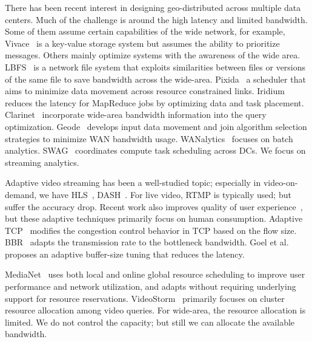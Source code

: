  There has been recent interest in designing
geo-distributed across multiple data centers. Much of the challenge is around
the high latency and limited bandwidth. Some of them assume certain capabilities
of the wide network, for example, Vivace~\cite{cho2012surviving} is a key-value
storage system but assumes the ability to prioritize messages. Others mainly
optimize systems with the awareness of the wide
area. LBFS~\cite{muthitacharoen2001low} is a network file system that exploits
similarities between files or versions of the same file to save bandwidth across
the wide-area.  Pixida~\cite{kloudas2015pixida} a scheduler that aims to
minimize data movement across resource constrained links.
Iridium~\cite{pu2015low} reduces the latency for MapReduce jobs by optimizing
data and task placement. Clarinet~\cite{viswanathan2016clarinet} incorporate
wide-area bandwidth information into the query
optimization. Geode~\cite{vulimiri2015global} develops input data movement and
join algorithm selection strategies to minimize WAN bandwidth
usage. WANalytics~\cite{vulimiri2015wananlytics} focuses on batch
analytics. SWAG~\cite{hung2015scheduling} coordinates compute task scheduling
across DCs. We focus on streaming analytics.


 Adaptive video streaming has been a
well-studied topic; especially in video-on-demand, we have
HLS~\cite{pantos2016http}, DASH~\cite{michalos2012dynamic}. For live video, RTMP
is typically used; but suffer the accuracy drop. Recent work also improves
quality of user experience~\cite{yin2015control}, but these adaptive techniques
primarily focus on human consumption. Adaptive TCP~\cite{wu2013adaptive}
modifies the congestion control behavior in TCP based on the flow
size. BBR~\cite{cardwell2017bbr} adapts the transmission rate to the bottleneck
bandwidth. Goel et al.~\cite{goel2008low} proposes an adaptive buffer-size
tuning that reduces the latency.

 MediaNet~\cite{hicks2003user} uses both local
and online global resource scheduling to improve user performance and network
utilization, and adapts without requiring underlying support for resource
reservations. VideoStorm~\cite{zhang2017live} primarily focuses on cluster
resource allocation among video queries. For wide-area, the resource allocation
is limited. We do not control the capacity; but still we can allocate the
available bandwidth.




